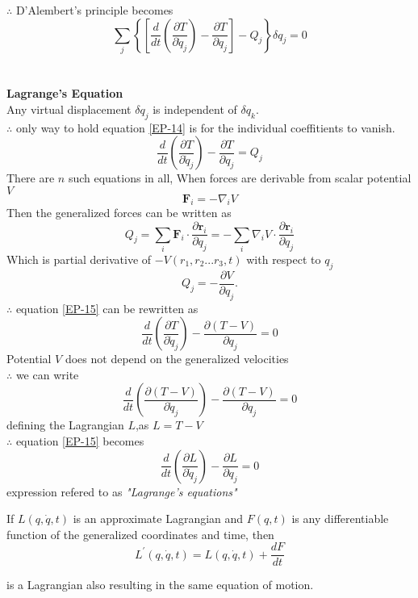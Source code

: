$\therefore$ D'Alembert's principle becomes
\begin{equation}
\sum_{j}\left\{\left[\frac{d}{d t}\left(\frac{\partial T}{\partial \dot{q}_{j}}\right)-\frac{\partial T}{\partial q_{j}}\right]-Q_{j}\right\} \delta q_{j}=0\label{EP-14}
\end{equation}\\\\
\textbf{Lagrange's Equation}\\
Any virtual displacement $\delta q_j$ is independent of $\delta q_k.$\\
$\therefore$ only way to hold equation \ref{EP-14} is for the individual coeffitients to vanish.
\begin{equation}
\frac{d}{d t}\left(\frac{\partial T}{\partial \dot{q}_{j}}\right)-\frac{\partial T}{\partial q_{j}}=Q_{j}\label{EP-15}
\end{equation}
There are $n$ such equations in all, When forces are derivable from scalar potential $V$
$$\mathbf{F}_{i}=-\nabla_{i} V$$
Then the generalized forces can be written as
$$Q_{j}=\sum_{i} \mathbf{F}_{i} \cdot \frac{\partial \mathbf{r}_{i}}{\partial q_{j}}=-\sum_{i} \nabla_{i} V \cdot \frac{\partial \mathbf{r}_{i}}{\partial q_{j}}$$
Which is partial derivative of $-V(r_1,r_2...r_3,t)$ with respect to $q_j$
\begin{equation}
Q_{j}=-\frac{\partial V}{\partial q_{j}} .\label{EP-16}
\end{equation}
$\therefore$ equation \ref{EP-15} can be rewritten as
\begin{equation}
\frac{d}{d t}\left(\frac{\partial T}{\partial \dot{q}_{j}}\right)-\frac{\partial (T-V)}{\partial q_{j}}=0
\end{equation}
Potential $V$ does not depend on the generalized velocities \\
$\therefore$ we can write 
$$\frac{d}{d t}\left( \frac{\partial (T-V)}{\partial \dot{q}_{j}} \right)  -\frac{\partial (T-V)}{\partial q_{j}}=0$$
defining the Lagrangian $L$,as $L=T-V$\\
$\therefore$ equation \ref{EP-15} becomes
$$\frac{d}{d t}\left(\frac{\partial L}{\partial \dot{q}_{j}}\right)-\frac{\partial L}{\partial q_{j}}=0$$
expression refered to as \textit{"Lagrange's equations"}
\begin{note}
	If $L(q,\dot{q},t)$ is an approximate Lagrangian and $F(q,t)$ is any differentiable function of the generalized coordinates and time, then
	$$L^{\prime}(q, \dot{q}, t)=L(q, \dot{q}, t)+\frac{d F}{d t}$$
\end{note}
is a Lagrangian also resulting in the same equation of motion.\\
